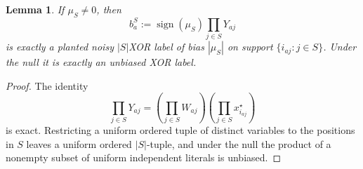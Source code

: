 \documentclass[11pt]{article}
\newtheorem{lemma}[lemma]{Lemma}
\theoremstyle{definition}
\theoremstyle{remark}
\newcommand{\1}{\mathbf 1}
\DeclareMathOperator{\sign}{sign}
\numberwithin{equation}{section}
\begin{document}
\begin{lemma}\label{lem:exact-csp-channel}
If $\mu_S\ne0$, then
\begin{equation}\label{eq:csp-derived-label}
 b_a^S:=\sign(\mu_S)\prod_{j\in S}Y_{aj}
\end{equation}
is exactly a planted noisy $|S|$XOR label of bias $|\mu_S|$ on support
$\{i_{aj}:j\in S\}$.  Under the null it is exactly an unbiased XOR label.
\end{lemma}
\begin{proof}
The identity
\[
 \prod_{j\in S}Y_{aj}
 =\left(\prod_{j\in S}W_{aj}\right)
  \left(\prod_{j\in S}x_{i_{aj}}^\star\right)
\]
is exact.  Restricting a uniform ordered tuple of distinct variables to
the positions in $S$ leaves a uniform ordered $|S|$-tuple, and under the
null the product of a nonempty subset of uniform independent literals is
unbiased.
\end{proof}
\end{document}
